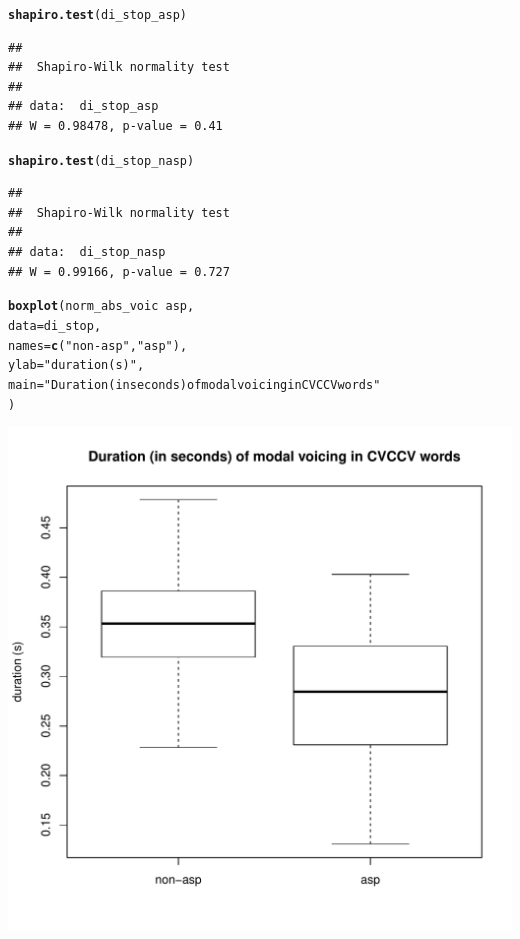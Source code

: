 \documentclass[a4paper,11pt]{article}\usepackage[]{graphicx}\usepackage[]{color}
\makeatletter
\def\maxwidth{ %
  \ifdim\Gin@nat@width>\linewidth
    \linewidth
  \else
    \Gin@nat@width
  \fi
}
\newcommand{\hlstr}[1]{\textcolor[rgb]{0.192,0.494,0.8}{#1}}%
\newcommand{\hlopt}[1]{\textcolor[rgb]{0,0,0}{#1}}%
\newcommand{\hlstd}[1]{\textcolor[rgb]{0.345,0.345,0.345}{#1}}%
\newcommand{\hlkwc}[1]{\textcolor[rgb]{0.333,0.667,0.333}{#1}}%
\newcommand{\hlkwd}[1]{\textcolor[rgb]{0.737,0.353,0.396}{\textbf{#1}}}%
\newenvironment{kframe}{%
 \def\at@end@of@kframe{}%
 \ifinner\ifhmode%
  \def\at@end@of@kframe{\end{minipage}}%
  \begin{minipage}{\columnwidth}%
 \fi\fi%
 \def\FrameCommand##1{\hskip\@totalleftmargin \hskip-\fboxsep
 \colorbox{shadecolor}{##1}\hskip-\fboxsep
     \hskip-\linewidth \hskip-\@totalleftmargin \hskip\columnwidth}%
 \MakeFramed {\advance\hsize-\width
   \@totalleftmargin\z@ \linewidth\hsize
   \@setminipage}}%
 {\par\unskip\endMakeFramed%
 \at@end@of@kframe}
\newenvironment{knitrout}{}{} %
\makeatother
\begin{document}
\begin{knitrout}
\end{knitrout}

\begin{knitrout}
\color{fgcolor}\begin{kframe}
\begin{alltt}
\hlkwd{shapiro.test}\hlstd{(di_stop_asp)}
\end{alltt}
\begin{verbatim}
## 
## 	Shapiro-Wilk normality test
## 
## data:  di_stop_asp
## W = 0.98478, p-value = 0.41
\end{verbatim}
\begin{alltt}
\hlkwd{shapiro.test}\hlstd{(di_stop_nasp)}
\end{alltt}
\begin{verbatim}
## 
## 	Shapiro-Wilk normality test
## 
## data:  di_stop_nasp
## W = 0.99166, p-value = 0.727
\end{verbatim}
\end{kframe}
\end{knitrout}

\begin{knitrout}
\color{fgcolor}\begin{kframe}
\begin{alltt}
\hlkwd{boxplot}\hlstd{(norm_abs_voic} \hlopt{~} \hlstd{asp,}
        \hlkwc{data} \hlstd{= di_stop,}
        \hlkwc{names} \hlstd{=} \hlkwd{c}\hlstd{(}\hlstr{"non-asp"}\hlstd{,} \hlstr{"asp"}\hlstd{),}
        \hlkwc{ylab} \hlstd{=} \hlstr{"duration (s)"}\hlstd{,}
        \hlkwc{main} \hlstd{=} \hlstr{"Duration (in seconds) of modal voicing in CVCCV words"}
        \hlstd{)}
\end{alltt}
\end{kframe}
\includegraphics[width=\maxwidth]{img/bi-stop-box-1} 

\end{knitrout}
\end{document}
